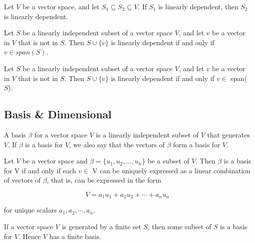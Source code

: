 \begin{thm}%
	Let $V$ be a vector space, and let $S_1 \subseteq S_2 \subseteq V$. If $S_1$ is linearly dependent, then $S_2$ is linearly dependent.
\end{thm}
\pfshow{}

\begin{cor}%
	Let $S$ be a linearly independent subset of a vector space $V$, and let $v$ be a vector in $V$ that is not in $S$. Then $S \cup \{v\}$ is linearly dependent if and only if $v \in span(S)$.
\end{cor}
\pfshow{}


\begin{thm} %
	Let $S$ be a linearly independent subset of a vector space $V$, and let $v$ be a vector in $V$ that is not in $S$. Then $S \cup \{v\}$ is linearly dependent if and only if $v \in $ span($S$).
\end{thm}
\pfshow{}

\subsection{Basis \& Dimensional}


\begin{defn}[Basis]
A basis $\beta$ for a vector space $V$ is a linearly independent subset of $V$ that generates $V$. If $\beta$ is a basis for $V$, we also say that the vectors of $\beta$ form a basis for $V$.
		
\end{defn}

\begin{thm} %
	Let $V$ be a vector space and $\beta = \{u_1,u_2,...,u_n \}$ be a subset of $V$. Then $\beta$ is a basis for V if and only if each  $v\in$ V can be uniquely expressed as a linear combination of vectors of $\beta$, that is, can be expressed in the form

	$$ V = a_1u_1 + a_2u_2 + \cdots+ a_nu_n $$

for unique scalars $a_1, a_2, \cdots , a_n$.	
\end{thm}
\pfshow{}


\begin{thm} %
	If a vector space $V$ is generated by a finite set $S$, then some subset of $S$ is a basis for $V$. Hence $V$ has a finite basis.	
\end{thm}
\pfshow{}


